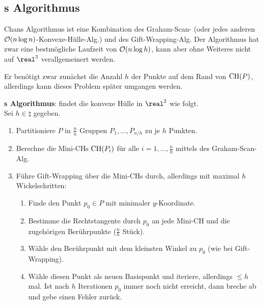 \pagebreak

\subsection{%
    s Algorithmus%
}

Chans Algorithmus ist eine Kombination des Graham-Scan-
(oder jedes anderen $\mathcal{O}(n \log n)$-Konvexe-Hülle-Alg.)
und des Gift-Wrapping-Alg.
Der Algorithmus hat zwar eine bestmögliche Laufzeit von $\mathcal{O}(n \log h)$,
kann aber ohne Weiteres nicht auf $\real^3$ verallgemeinert werden.

Er benötigt zwar zunächst die Anzahl $h$ der Punkte auf dem Rand von $\operatorname{CH}(P)$,
allerdings kann dieses Problem später umgangen werden.

\textbf{s Algorithmus}:
 findet die konvexe Hülle in $\real^2$ wie folgt.\\
Sei $h \in \natural$ gegeben.
\begin{enumerate}
    \item
    Partitioniere $P$ in $\frac{n}{h}$ Gruppen $P_1, \dotsc, P_{n/h}$ zu je $h$ Punkten.
    
    \item
    Berechne die Mini-CHs $\operatorname{CH}(P_i)$ für alle $i = 1, \dotsc, \frac{n}{h}$ mittels des
    Graham-Scan-Alg.
    
    \item
    Führe Gift-Wrapping über die Mini-CHs durch, allerdings mit maximal $h$ Wickelschritten:
    \begin{enumerate}[label=\emph{(\roman*)}]
        \item
        Finde den Punkt $p_0 \in P$ mit minimaler $y$-Koordinate.
        
        \item
        Bestimme die Rechtstangente durch $p_0$ an jede Mini-CH und die zugehörigen
        Berührpunkte ($\frac{n}{h}$ Stück).
        
        \item
        Wähle den Berührpunkt mit dem kleinsten Winkel zu $p_0$ (wie bei Gift-Wrapping).
        
        \item
        Wähle diesen Punkt als neuen Basispunkt und iteriere,
        allerdings $\le h$ mal.
        Ist nach $h$ Iterationen $p_0$ immer noch nicht erreicht, dann breche ab und
        gebe einen Fehler zurück.
    \end{enumerate}
\end{enumerate}

